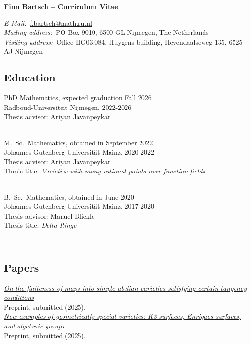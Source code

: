 \documentclass[paper=a4,fontsize=10pt,DIV=11,BCOR=3mm,pdftex]{scrartcl}
\begin{document}
\thispagestyle{empty}
{
\centering
\Large \textbf{Finn Bartsch -- Curriculum Vitae} \par
}
\bigskip \par
\textit{E-Mail:}~\href{mailto:f.bartsch@math.ru.nl}{f.bartsch@math.ru.nl} \\
\textit{Mailing address:}~PO Box 9010, 6500 GL Nijmegen, The Netherlands \\
\textit{Visiting address:}~Office HG03.084, Huygens building, Heyendaalseweg 135, 6525 AJ Nijmegen \\
\par

\subsection*{Education}
PhD Mathematics, expected graduation Fall 2026 \\
Radboud-Universiteit Nijmegen, 2022-2026 \\
Thesis advisor: Ariyan Javanpeykar \\
~\par

M.~Sc.~Mathematics, obtained in September 2022 \\
Johannes Gutenberg-Universität Mainz, 2020-2022 \\
Thesis advisor: Ariyan Javanpeykar \\
Thesis title: \textit{Varieties with many rational points over function fields} \\
~\par

B.~Sc.~Mathematics, obtained in June 2020 \\
Johannes Gutenberg-Universität Mainz, 2017-2020 \\
Thesis advisor: Manuel Blickle \\
Thesis title: \textit{Delta-Ringe}

~\par


\subsection*{Papers}

\href{https://arxiv.org/abs/2502.09414}{\textit{On the finiteness of maps into simple abelian varieties satisfying certain tangency conditions}} \\
Preprint, submitted (2025). \\

\href{https://arxiv.org/abs/2502.09400}{\textit{New examples of geometrically special varieties: K3 surfaces, Enriques surfaces, and algebraic groups}} \\
Preprint, submitted (2025). \\
\end{document}
